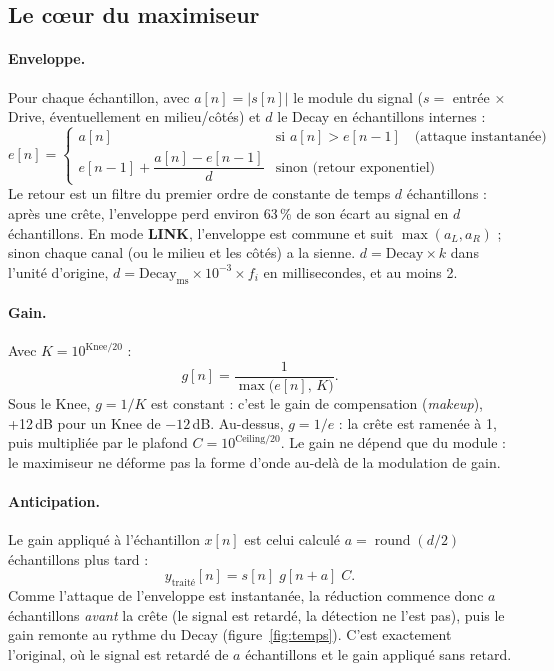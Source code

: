 \documentclass[a4paper,11pt]{article}
\newcommand{\ctl}[1]{\textsf{\textbf{#1}}}   %
\newcommand{\dB}{\,dB}
\begin{document}
\subsection{Le cœur du maximiseur}\label{sec:coeur}

\paragraph{Enveloppe.} Pour chaque échantillon, avec $a[n] = |s[n]|$ le module du signal
($s = $ entrée × Drive, éventuellement en milieu/côtés) et $d$ le Decay en échantillons internes :
\[
e[n] =
\begin{cases}
a[n] & \text{si } a[n] > e[n-1] \quad\text{(attaque instantanée)}\\[2pt]
e[n-1] + \dfrac{a[n] - e[n-1]}{d} & \text{sinon (retour exponentiel)}
\end{cases}
\]
Le retour est un filtre du premier ordre de constante de temps $d$ échantillons : après une
crête, l'enveloppe perd environ 63\,\% de son écart au signal en $d$ échantillons. En mode
\ctl{LINK}, l'enveloppe est commune et suit $\max(a_L, a_R)$ ; sinon chaque canal (ou le milieu
et les côtés) a la sienne. $d = \mathrm{Decay} \times k$ dans l'unité d'origine,
$d = \mathrm{Decay_{ms}} \times 10^{-3} \times f_i$ en millisecondes, et au moins 2.

\paragraph{Gain.} Avec $K = 10^{\mathrm{Knee}/20}$ :
\[
g[n] = \frac{1}{\max\bigl(e[n],\, K\bigr)} .
\]
Sous le Knee, $g = 1/K$ est constant : c'est le gain de compensation (\emph{makeup}), +12\dB{}
pour un Knee de $-12$\dB. Au-dessus, $g = 1/e$ : la crête est ramenée à 1, puis multipliée par
le plafond $C = 10^{\mathrm{Ceiling}/20}$. Le gain ne dépend que du module : le maximiseur ne
déforme pas la forme d'onde au-delà de la modulation de gain.

\paragraph{Anticipation.} Le gain appliqué à l'échantillon $x[n]$ est celui calculé
$a = \operatorname{round}(d/2)$ échantillons plus tard :
\[
y_{\text{traité}}[n] = s[n]\; g[n+a]\; C .
\]
Comme l'attaque de l'enveloppe est instantanée, la réduction commence donc $a$ échantillons
\emph{avant} la crête (le signal est retardé, la détection ne l'est pas), puis le gain remonte
au rythme du Decay (figure~\ref{fig:temps}). C'est exactement l'original, où le signal est
retardé de $a$ échantillons et le gain appliqué sans retard.
\end{document}

